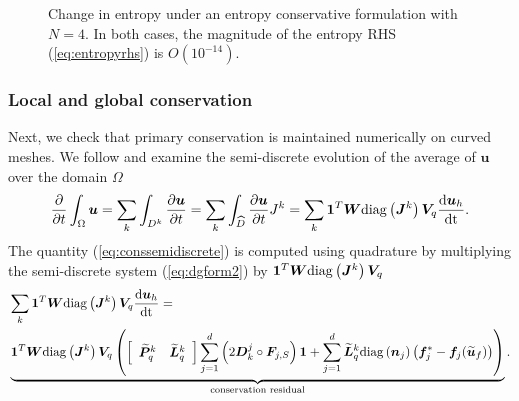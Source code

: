 \documentclass[preprint,10pt]{article}
\theoremstyle{definition}
\theoremstyle{lemma}
\theoremstyle{theorem}
\theoremstyle{assumption}
\renewcommand{\hat}{\widehat}
\renewcommand{\tilde}{\widetilde}
\newcommand{\td}[2]{\frac{{\rm d}#1}{{\rm d}{\rm #2}}}
\newcommand{\pd}[2]{\frac{\partial#1}{\partial#2}}
\newcommand{\LRp}[1]{\left( #1 \right)}
\newcommand{\LRs}[1]{\left[ #1 \right]}
\newcommand{\diag}[1]{{\rm diag}\LRp{#1}}
\begin{document}
{\begin{figure}
{
}
\caption{Change in entropy under an entropy conservative formulation with $N=4$.  In both cases, the magnitude of the entropy RHS (\ref{eq:entropyrhs}) is $O\LRp{10^{-14}}$. }
\label{fig:dSconverge}
\end{figure}


\subsubsection{Local and global conservation}
\label{sec:conservation}
Next, we check that primary conservation is maintained numerically on curved meshes.  We follow \cite{friedrich2017entropy} and examine the semi-discrete evolution of the average of $\bm{u}$ over the domain $\Omega$
\begin{align}
\pd{}{t}\int_{\Omega} \bm{u} = \sum_k \int_{D^k} \pd{\bm{u}}{t} = \sum_k \int_{\hat{D}} \pd{\bm{u}}{t} J^k = \sum_k \bm{1}^T \bm{W}\diag{\bm{J}^k} \bm{V}_q \td{\bm{u}_h}{t}.  
\label{eq:conssemidiscrete}
\end{align}
The quantity (\ref{eq:conssemidiscrete}) is computed using quadrature by multiplying the semi-discrete system (\ref{eq:dgform2}) by $\bm{1}^T\bm{W}\diag{\bm{J}^k} \bm{V}_q$
\begin{align}
&\sum_k \bm{1}^T \bm{W}\diag{\bm{J}^k} \bm{V}_q \td{\bm{u}_h}{t}= \nonumber\\
& \underbrace{\bm{1}^T\bm{W}\diag{\bm{J}^k}\bm{V}_q\LRp{
 \LRs{\begin{array}{cc}\tilde{\bm{P}}^k_q & \tilde{\bm{L}}^k_q\end{array}} \sum_{j=1}^d \LRp{2\bm{D}^j_k \circ \bm{F}_{j,S}}\bm{1} + \sum_{j=1}^d \tilde{\bm{L}}^k_q \diag{\bm{n}_j}\LRp{\bm{f}_j^* - \bm{f}_j(\tilde{\bm{u}}_f)}}}_{\text{conservation residual}}.
 \label{eq:consres}
\end{align}

}
\end{document}
